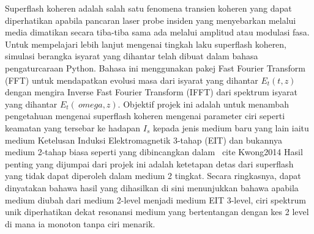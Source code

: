 
Superflash koheren adalah salah satu fenomena transien koheren yang dapat diperhatikan apabila pancaran laser probe insiden yang menyebarkan melalui media dimatikan secara tiba-tiba sama ada melalui amplitud atau modulasi fasa. Untuk mempelajari lebih lanjut mengenai tingkah laku superflash koheren, simulasi berangka isyarat yang dihantar telah dibuat dalam bahasa pengaturcaraan Python. Bahasa ini menggunakan pakej Fast Fourier Transform (FFT) untuk mendapatkan evolusi masa dari isyarat yang dihantar $ E_ {t} (t, z) $ dengan mengira Inverse Fast Fourier Transform (IFFT) dari spektrum isyarat yang dihantar $ E_ { t} (\ omega, z) $. Objektif projek ini adalah untuk menambah pengetahuan mengenai superflash koheren mengenai parameter ciri seperti keamatan yang tersebar ke hadapan $ I_ {s} $ kepada jenis medium baru yang lain iaitu medium Ketelusan Induksi Elektromagnetik 3-tahap (EIT) dan bukannya medium 2-tahap biasa seperti yang dibincangkan dalam \ cite {Kwong2014} Hasil penting yang dijumpai dari projek ini adalah ketetapan detas dari superflash yang tidak dapat diperoleh dalam medium 2 tingkat. Secara ringkasnya, dapat dinyatakan bahawa hasil yang dihasilkan di sini menunjukkan bahawa apabila medium diubah dari medium 2-level menjadi medium EIT 3-level, ciri spektrum unik diperhatikan dekat resonansi medium yang bertentangan dengan kes 2 level di mana ia monoton tanpa ciri menarik.

